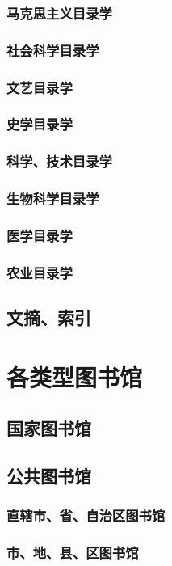 \documentclass[UTF8]{../../ApplicationUniverse}
\begin{document}
    \subsubsection{马克思主义目录学}
    \subsubsection{社会科学目录学}
    \subsubsection{文艺目录学}
    \subsubsection{史学目录学}
    \subsubsection{科学、技术目录学}
    \subsubsection{生物科学目录学}
    \subsubsection{医学目录学}
    \subsubsection{农业目录学}
\subsection{文摘、索引}


\section{各类型图书馆}
\subsection{国家图书馆}
\subsection{公共图书馆}
    \subsubsection{直辖市、省、自治区图书馆}
    \subsubsection{市、地、县、区图书馆}
\end{document}
